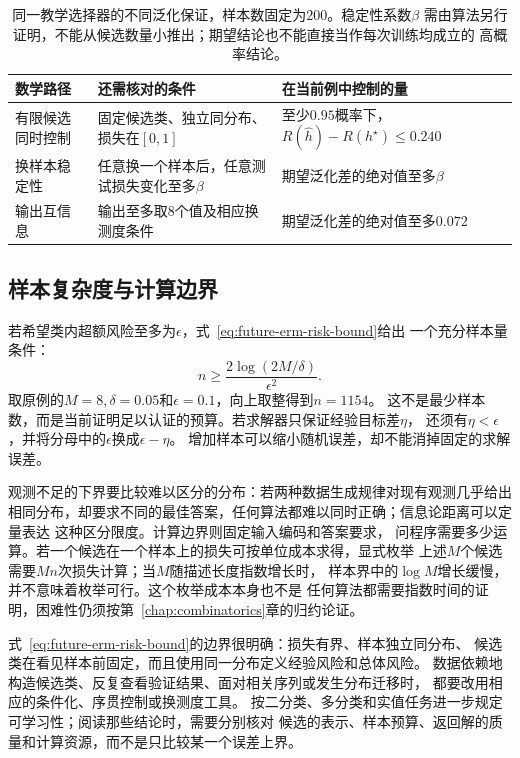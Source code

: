 \begin{table}[htbp]
  \centering
  \begin{tabularx}{\linewidth}{lXX}
    \toprule
    数学路径 & 还需核对的条件 & 在当前例中控制的量\\
    \midrule
    有限候选同时控制 & 固定候选类、独立同分布、损失在$[0,1]$ & 至少$0.95$概率下，
    $R(\widehat h)-R(h^\star)\leq0.240$\\
    换样本稳定性 & 任意换一个样本后，任意测试损失变化至多$\beta$ & 期望泛化差的绝对值至多$\beta$\\
    输出互信息 & 输出至多取$8$个值及相应换测度条件 & 期望泛化差的绝对值至多$0.072$\\
    \bottomrule
  \end{tabularx}
  \caption{同一教学选择器的不同泛化保证，样本数固定为$200$。稳定性系数$\beta$
  需由算法另行证明，不能从候选数量小推出；期望结论也不能直接当作每次训练均成立的
  高概率结论。}
  \label{tab:future-generalization-guarantees}
\end{table}

\subsection{样本复杂度与计算边界}
\label{sec:future-learning-computation-boundaries}

若希望类内超额风险至多为$\epsilon$，式~\eqref{eq:future-erm-risk-bound}给出
一个充分样本量条件：
\[
  n\geq \frac{2\log(2M/\delta)}{\epsilon^2}.
\]
取原例的$M=8,\delta=0.05$和$\epsilon=0.1$，向上取整得到$n=1154$。
这不是最少样本数，而是当前证明足以认证的预算。若求解器只保证经验目标差$\eta$，
还须有$\eta<\epsilon$，并将分母中的$\epsilon$换成$\epsilon-\eta$。
增加样本可以缩小随机误差，却不能消掉固定的求解误差。

观测不足的下界要比较难以区分的分布：若两种数据生成规律对现有观测几乎给出
相同分布，却要求不同的最佳答案，任何算法都难以同时正确；信息论距离可以定量表达
这种区分限度。计算边界则固定输入编码和答案要求，
问程序需要多少运算。若一个候选在一个样本上的损失可按单位成本求得，显式枚举
上述$M$个候选需要$Mn$次损失计算；当$M$随描述长度指数增长时，
样本界中的$\log M$增长缓慢，并不意味着枚举可行。这个枚举成本本身也不是
任何算法都需要指数时间的证明，困难性仍须按第~\ref{chap:combinatorics}章的归约论证。

式~\eqref{eq:future-erm-risk-bound}的边界很明确：损失有界、样本独立同分布、
候选类在看见样本前固定，而且使用同一分布定义经验风险和总体风险。
数据依赖地构造候选类、反复查看验证结果、面对相关序列或发生分布迁移时，
都要改用相应的条件化、序贯控制或换测度工具。
按二分类、多分类和实值任务进一步规定可学习性；阅读那些结论时，需要分别核对
候选的表示、样本预算、返回解的质量和计算资源，而不是只比较某一个误差上界。

